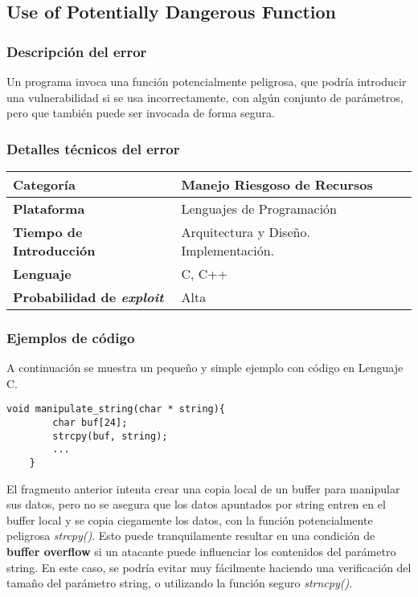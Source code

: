 \subsection{Use of Potentially Dangerous Function}

\subsubsection{Descripción del error}
Un programa invoca una función potencialmente peligrosa, que podría introducir una vulnerabilidad si se usa incorrectamente, con algún conjunto de parámetros, pero que
también puede ser invocada de forma segura.

\subsubsection{Detalles técnicos del error}
\begin{tabular}[\baselineskip]{|l|p{7cm}|}
  \hline
  \textbf{Categoría} & Manejo Riesgoso de Recursos \\
  \hline
  \textbf{Plataforma} & Lenguajes de Programación \\
  \hline
  \textbf{Tiempo de Introducción} & Arquitectura y Diseño. Implementación. \\
  \hline
  \textbf{Lenguaje} & C, C++ \\
  \hline
  \textbf{Probabilidad de \emph{exploit}} & Alta \\
  \hline
\end{tabular} 

\subsubsection{Ejemplos de código}
A continuación se muestra un pequeño y simple ejemplo con código en Lenguaje C.

\begin{lstlisting}[frame=single]
    void manipulate_string(char * string){
        char buf[24];
        strcpy(buf, string);
        ...
    }
\end{lstlisting}

El fragmento anterior intenta crear una copia local de un buffer para manipular sus datos, pero no se asegura que los datos apuntados por string entren en el
buffer local y se copia ciegamente los datos, con la función potencialmente peligrosa \textit{strcpy()}. Esto puede tranquilamente resultar en una condición de \textbf{buffer overflow}
si un atacante puede influenciar los contenidos del parámetro string. 
En este caso, se podría evitar muy fácilmente haciendo una verificación del tamaño del parámetro string, o utilizando la función seguro \textit{strncpy()}.

